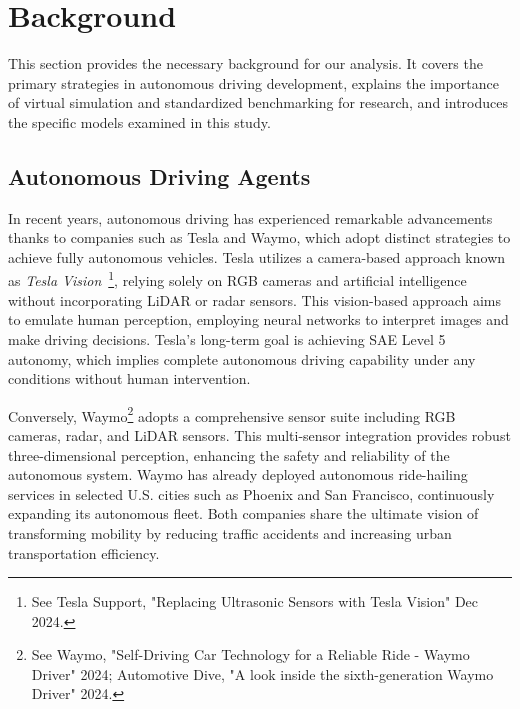 \section{Background}
\label{sec:background}

This section provides the necessary background for our analysis. It covers the primary strategies in autonomous driving development, explains the importance of virtual simulation and standardized benchmarking for research, and introduces the specific models examined in this study.

\subsection{Autonomous Driving Agents}
In recent years, autonomous driving has experienced remarkable advancements thanks to companies such as Tesla and Waymo, which adopt distinct strategies to achieve fully autonomous vehicles. Tesla utilizes a camera-based approach known as \textit{Tesla Vision}~\footnote{See Tesla Support, "Replacing Ultrasonic Sensors with Tesla Vision" Dec 2024.}, relying solely on RGB cameras and artificial intelligence without incorporating LiDAR or radar sensors. This vision-based approach aims to emulate human perception, employing neural networks to interpret images and make driving decisions. Tesla's long-term goal is achieving SAE Level 5 autonomy, which implies complete autonomous driving capability under any conditions without human intervention.

Conversely, Waymo\footnote{See Waymo, "Self-Driving Car Technology for a Reliable Ride - Waymo Driver" 2024; Automotive Dive, "A look inside the sixth-generation Waymo Driver" 2024.} adopts a comprehensive sensor suite including RGB cameras, radar, and LiDAR sensors. This multi-sensor integration provides robust three-dimensional perception, enhancing the safety and reliability of the autonomous system. Waymo has already deployed autonomous ride-hailing services in selected U.S. cities such as Phoenix and San Francisco, continuously expanding its autonomous fleet. Both companies share the ultimate vision of transforming mobility by reducing traffic accidents and increasing urban transportation efficiency.

